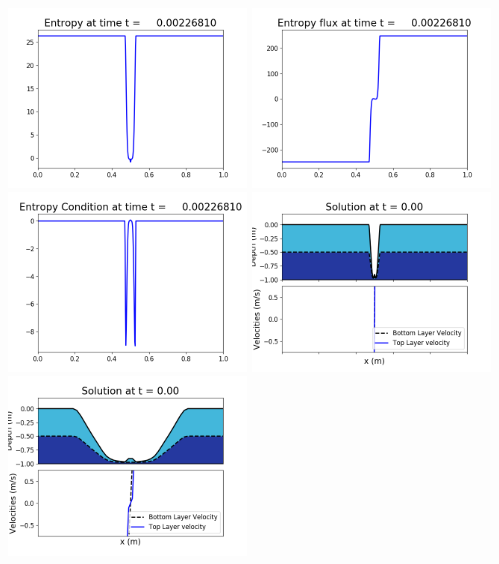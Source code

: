 \documentclass[11pt]{article}
\begin{document}
\vskip 10pt 
\includegraphics[width=0.475\textwidth]{frame0015fig1007.png}
\includegraphics[width=0.475\textwidth]{frame0015fig1008.png}
\vskip 10pt 
\includegraphics[width=0.475\textwidth]{frame0015fig1009.png}
\vskip 10pt 
\includegraphics[width=0.475\textwidth]{frame0016fig1001.png}
\includegraphics[width=0.475\textwidth]{frame0016fig1002.png}
\end{document}
